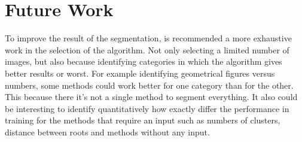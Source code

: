 \documentclass[10pt,twocolumn,letterpaper]{article}
\begin{document}
\section{Future Work}
To improve the result of the segmentation, is recommended a more exhaustive work in the selection of the algorithm. Not only selecting a limited number of images, but also because identifying categories in which the algorithm gives better results or worst. For example identifying geometrical figures versus numbers, some methods could work better for one category than for the other. This because there it's not a single method to segment everything. It also could be interesting to identify quantitatively how exactly differ the performance in training for the methods that require an input such as numbers of clusters, distance between roots and methods without any input.

{\small


}
\end{document}
